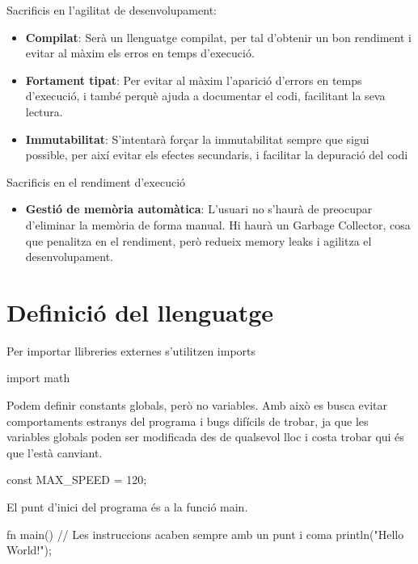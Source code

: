 ﻿\documentclass{article}
\begin{document}
Sacrificis en l'agilitat de desenvolupament:
\begin{itemize}
    \item \textbf{Compilat}: Serà un llenguatge compilat, per tal d'obtenir un
        bon rendiment i evitar al màxim els erros en temps d'execució.
    \item \textbf{Fortament tipat}: Per evitar al màxim l'aparició d'errors en
        temps d'execució, i també perquè ajuda a documentar el codi, facilitant
        la seva lectura.
    \item \textbf{Immutabilitat}: S'intentarà forçar la immutabilitat sempre que
        sigui possible, per així evitar els efectes secundaris, i facilitar la depuració
        del codi
\end{itemize}

Sacrificis en el rendiment d'execució
\begin{itemize}
    \item \textbf{Gestió de memòria automàtica}: L'usuari no s'haurà de preocupar
        d'eliminar la memòria de forma manual. Hi haurà un Garbage Collector,
        cosa que penalitza en el rendiment, però redueix memory leaks i agilitza
        el desenvolupament.
\end{itemize}

\section{Definició del llenguatge}

Per importar llibreries externes s'utilitzen imports

\begin{code}
import math
\end{code}

Podem definir constants globals, però no variables. Amb això es busca evitar
comportaments estranys del programa i bugs difícils de trobar, ja que les
variables globals poden ser modificada des de qualsevol lloc i costa trobar
qui és que l'està canviant.

\begin{code}
const MAX_SPEED = 120;
\end{code}

El punt d'inici del programa és a la funció main.

\begin{code}
fn main() {
    // Les instruccions acaben sempre amb un punt i coma
    println("Hello World!");
}
\end{code}
\end{document}

